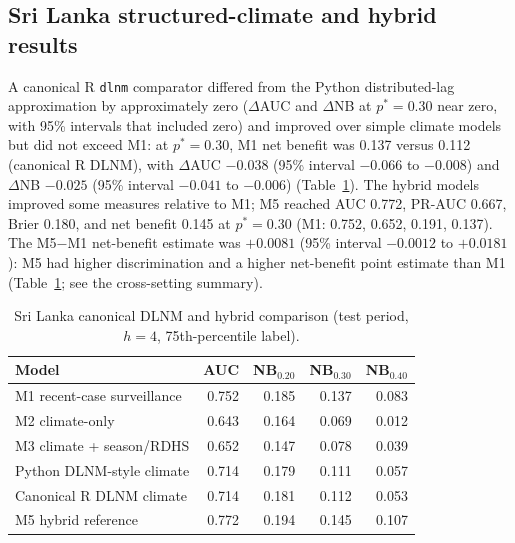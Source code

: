 \documentclass[11pt,a4paper]{article}
\begin{document}
\subsection{Sri Lanka structured-climate and hybrid results}
A canonical R \texttt{dlnm} comparator differed from the Python distributed-lag approximation by approximately zero ($\Delta$AUC and $\Delta$NB at $p^*=0.30$ near zero, with 95\% intervals that included zero) and improved over simple climate models but did not exceed M1: at $p^*=0.30$, M1 net benefit was 0.137 versus 0.112 (canonical R DLNM), with $\Delta$AUC $-0.038$ (95\% interval $-0.066$ to $-0.008$) and $\Delta$NB $-0.025$ (95\% interval $-0.041$ to $-0.006$) (Table~\ref{tab:dlnmhybrid}). The hybrid models improved some measures relative to M1; M5 reached AUC 0.772, PR-AUC 0.667, Brier 0.180, and net benefit 0.145 at $p^*=0.30$ (M1: 0.752, 0.652, 0.191, 0.137). The M5$-$M1 net-benefit estimate was $+0.0081$ (95\% interval $-0.0012$ to $+0.0181$): M5 had higher discrimination and a higher net-benefit point estimate than M1 (Table~\ref{tab:dlnmhybrid}; see the cross-setting summary).

\begin{table}[htbp]
\centering
\caption{Sri Lanka canonical DLNM and hybrid comparison (test period, $h=4$, 75th-percentile label).}
\label{tab:dlnmhybrid}
\small
\begin{tabular}{lrrrr}
\toprule
Model & AUC & NB$_{0.20}$ & NB$_{0.30}$ & NB$_{0.40}$ \\
\midrule
M1 recent-case surveillance & 0.752 & 0.185 & 0.137 & 0.083 \\
M2 climate-only & 0.643 & 0.164 & 0.069 & 0.012 \\
M3 climate + season/RDHS & 0.652 & 0.147 & 0.078 & 0.039 \\
Python DLNM-style climate & 0.714 & 0.179 & 0.111 & 0.057 \\
Canonical R DLNM climate & 0.714 & 0.181 & 0.112 & 0.053 \\
M5 hybrid reference & 0.772 & 0.194 & 0.145 & 0.107 \\
\bottomrule
\end{tabular}
\end{table}
\end{document}
